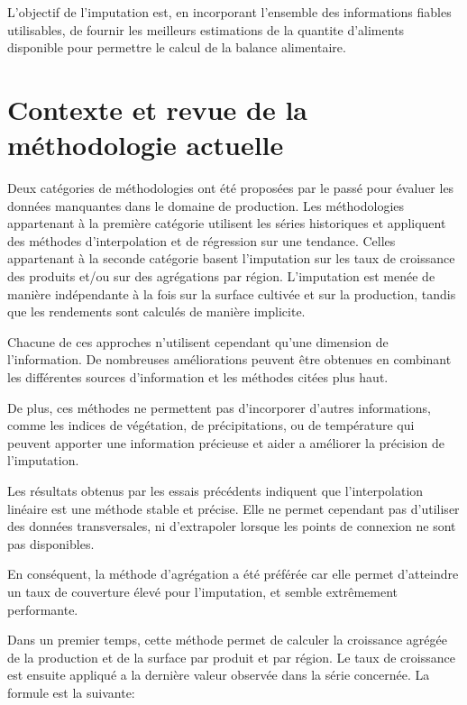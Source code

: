 \documentclass[nojss]{jss}\usepackage{graphicx, color}
\begin{document}
L'objectif de l'imputation est, en incorporant l'ensemble des
informations fiables utilisables, de fournir les meilleurs estimations
de la quantite d'aliments disponible pour permettre le calcul de la
balance alimentaire.


\section{Contexte et revue de la m\'{e}thodologie actuelle}
Deux cat\'{e}gories de m\'{e}thodologies ont \'{e}t\'{e} propos\'{e}es
par le pass\'{e} pour \'{e}valuer les donn\'{e}es manquantes dans le
domaine de production. Les m\'{e}thodologies appartenant \`{a} la
premi\`{e}re cat\'{e}gorie utilisent les s\'{e}ries historiques et
appliquent des m\'{e}thodes d'interpolation et de r\'{e}gression sur
une tendance.  Celles appartenant \`{a} la seconde cat\'{e}gorie
basent l'imputation sur les taux de croissance des produits et/ou sur
des agr\'{e}gations par r\'{e}gion. L'imputation est men\'{e}e de
mani\`{e}re ind\'{e}pendante \`{a} la fois sur la surface cultiv\'{e}e
et sur la production, tandis que les rendements sont calcul\'{e}s de
mani\`{e}re implicite.


Chacune de ces approches n'utilisent cependant qu'une dimension de
l'information. De nombreuses am\'{e}liorations peuvent \^{e}tre obtenues
en combinant les diff\'{e}rentes sources d'information et les
m\'{e}thodes cit\'{e}es plus haut.

De plus, ces m\'{e}thodes ne permettent pas d'incorporer d'autres
informations, comme les indices de v\'{e}g\'{e}tation, de
pr\'{e}cipitations, ou de temp\'{e}rature qui peuvent apporter une
information pr\'{e}cieuse et aider a am\'{e}liorer la pr\'{e}cision de
l'imputation.


Les r\'{e}sultats obtenus par les essais pr\'{e}c\'{e}dents indiquent
que l'interpolation lin\'{e}aire est une m\'{e}thode stable et
pr\'{e}cise. Elle ne permet cependant pas d'utiliser des donn\'{e}es
transversales, ni d'extrapoler lorsque les points de connexion ne sont
pas disponibles.

En cons\'{e}quent, la m\'{e}thode d'agr\'{e}gation a \'{e}t\'{e}
pr\'{e}f\'{e}r\'{e}e car elle permet d'atteindre un taux de couverture
\'{e}lev\'{e} pour l'imputation, et semble extr\^{e}mement
performante.


Dans un premier temps, cette m\'{e}thode permet de calculer la
croissance agr\'{e}g\'{e}e de la production et de la surface par
produit et par r\'{e}gion.  Le taux de croissance est ensuite
appliqu\'{e} a la derni\`{e}re valeur observ\'{e}e dans la s\'{e}rie
concern\'{e}e. La formule est la suivante:
\end{document}
